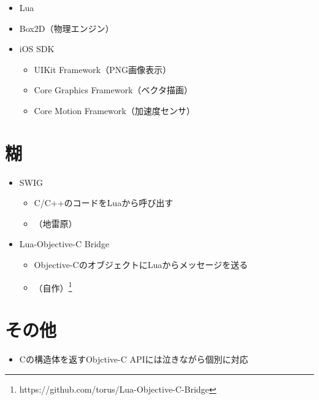 \documentclass[slide,papersize]{jsarticle}
\begin{document}
\begin{itemize}
 \item Lua
 \item Box2D（物理エンジン）
 \item iOS SDK
       \begin{itemize}
        \item UIKit Framework（PNG画像表示）
        \item Core Graphics Framework（ベクタ描画）
        \item Core Motion Framework（加速度センサ）
       \end{itemize}
\end{itemize}


\section*{糊}

\begin{itemize}
 \item SWIG
       \begin{itemize}
        \item C/C++のコードをLuaから呼び出す
        \item （地雷原）
       \end{itemize}

 \item Lua-Objective-C Bridge
       \begin{itemize}
        \item Objective-CのオブジェクトにLuaからメッセージを送る
        \item （自作）\footnote{https://github.com/torus/Lua-Objective-C-Bridge}
       \end{itemize}
\end{itemize}

\section*{その他}

\begin{itemize}
  \item Cの構造体を返すObjctive-C APIには泣きながら個別に対応
\end{itemize}
\end{document}
